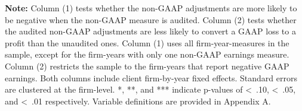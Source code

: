 \documentclass[12pt,fleqn]{article}
\begin{document}
\clearpage
\begin{table}[!htbp] 
    \begin{threeparttable}[b]
        \captionsetup{labelfont = bf, singlelinecheck = off, justification = raggedright, labelsep = none}   
        \caption{\\Alternative Dependent Variables}
        \small

        \begin{flushleft}
           {\raggedright
           
           \par}
        \end{flushleft}

        \vspace{-6 mm}
        
        \begin{tablenotes}
            \scriptsize
            \item \textbf{Note:} Column (1) tests whether the non-GAAP adjustments are more likely to be negative when the non-GAAP measure is audited. Column (2) tests whether the audited non-GAAP adjustments are less likely to convert a GAAP loss to a profit than the unaudited ones. Column (1) uses all firm-year-measures in the sample, except for the firm-years with only one non-GAAP earnings measure. Column (2) restricts the sample to the firm-years that report negative GAAP earnings. Both columns include client firm-by-year fixed effects. Standard errors are clustered at the firm-level. *, **, and *** indicate p-values of \textless\, .10, \textless\, .05, and \textless\, .01 respectively. Variable definitions are provided in Appendix A.
        \end{tablenotes}
        \label{table:negadj}
    \end{threeparttable}
\end{table}
\end{document}
